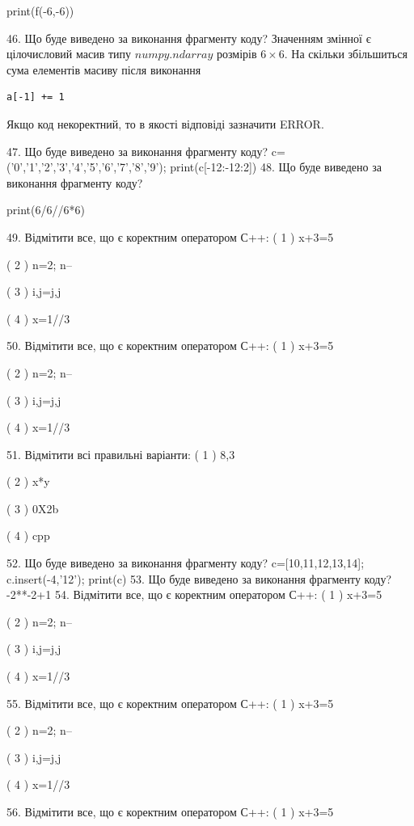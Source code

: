 \documentclass[11pt]{article}
\begin{document}
print(f(-6,-6))

46. Що буде виведено за виконання фрагменту коду?
Значенням змінної  є цілочисловий масив типу $numpy.ndarray$ розмірів $6{\times}6$. На скільки збільшиться сума елементів масиву  після виконання
\begin{verbatim}
a[-1] += 1
\end{verbatim}


Якщо код некоректний, то в якості відповіді зазначити ERROR.



47. Що буде виведено за виконання фрагменту коду?
c=('0','1','2','3','4','5','6','7','8','9'); print(c[-12:-12:2])
48. Що буде виведено за виконання фрагменту коду?

print(6/6//6*6)

49. Відмітити все, що є коректним оператором С++:
( 1 ) x+3=5

( 2 ) n=2; n--

( 3 ) i,j=j,j

( 4 ) x=1//3

50. Відмітити все, що є коректним оператором С++:
( 1 ) x+3=5

( 2 ) n=2; n--

( 3 ) i,j=j,j

( 4 ) x=1//3

51. Відмітити всі правильні варіанти:
( 1 ) 8,3

( 2 ) x*y

( 3 ) 0X2b

( 4 ) cpp

52. Що буде виведено за виконання фрагменту коду?
c=[10,11,12,13,14]; c.insert(-4,'12'); print(c)
53. Що буде виведено за виконання фрагменту коду?
-2**-2+1
54. Відмітити все, що є коректним оператором С++:
( 1 ) x+3=5

( 2 ) n=2; n--

( 3 ) i,j=j,j

( 4 ) x=1//3

55. Відмітити все, що є коректним оператором С++:
( 1 ) x+3=5

( 2 ) n=2; n--

( 3 ) i,j=j,j

( 4 ) x=1//3

56. Відмітити все, що є коректним оператором С++:
( 1 ) x+3=5
\end{document}
